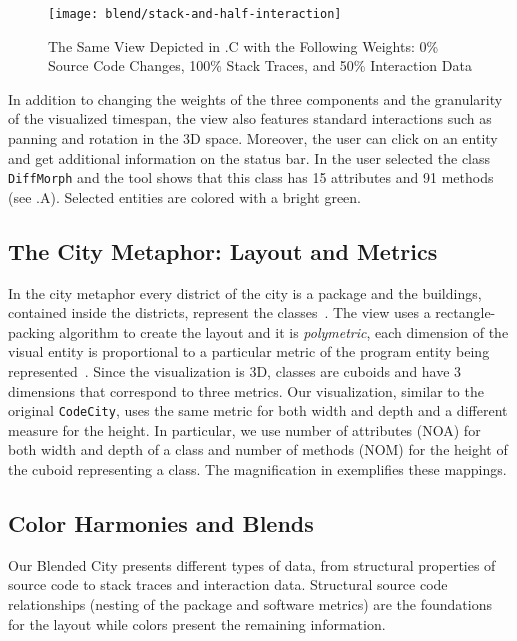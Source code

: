 \begin{figure}[ht]
\centering
\texttt{[image: blend/stack-and-half-interaction]}
\caption{The Same View Depicted in .C with the Following Weights: 0\% Source Code Changes, 100\% Stack Traces, and 50\% Interaction Data}
\label{fig:stack-and-half-interaction}
\end{figure}

In addition to changing the weights of the three components and the granularity of the visualized timespan, the view also features standard interactions such as panning and rotation in the 3D space.
Moreover, the user can click on an entity and get additional information on the status bar.
In  the user selected the class \texttt{DiffMorph} and the tool shows that this class has 15 attributes and 91 methods (see .A).
Selected entities are colored with a bright green.


\subsection{The City Metaphor: Layout and Metrics}

In the city metaphor every  district of the city is a package and the buildings, contained inside the districts, represent the classes~\cite{Wett2007}.
The view uses a rectangle-packing algorithm to create the layout and it is \emph{polymetric}, \ie each dimension of the visual entity is proportional to a particular metric of the program entity being represented~\cite{Lanz2004}.
Since the visualization is 3D, classes are cuboids and have 3 dimensions that correspond to three metrics.
Our visualization, similar to the original \texttt{CodeCity}, uses the same metric for both width and depth and a different measure for the height.
In particular, we use number of attributes (\ie NOA) for both width and depth of a class and number of methods (\ie NOM) for the height of the cuboid representing a class.
The magnification in  exemplifies these mappings.

\subsection{Color Harmonies and Blends}

Our Blended City presents different types of data, from structural properties of source code to stack traces and interaction data.
Structural source code relationships (\ie nesting of the package and software metrics) are the foundations for the layout while colors present the remaining information.

